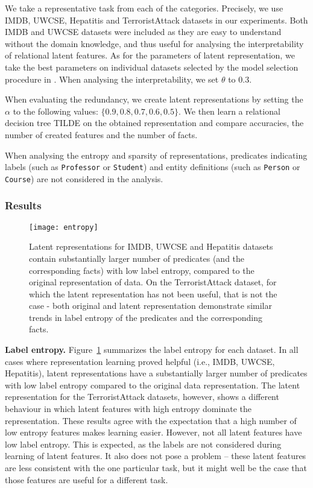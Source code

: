 We take a representative task from each of the categories.
Precisely, we use IMDB, UWCSE, Hepatitis and TerroristAttack datasets in our experiments.
Both IMDB and UWCSE datasets were included as they are easy to understand without the domain knowledge, and thus useful for analysing the interpretability of relational latent features.
As for the parameters of latent representation, we take the best parameters on individual datasets selected by the model selection procedure in \cite{Dumancic2017}.
When analysing the interpretability, we set $\theta$ to $0.3$.

When evaluating the redundancy, we create latent representations by setting the $\alpha$ to the following values: $\{0.9, 0.8, 0.7, 0.6, 0.5\}$.
We then learn a relational decision tree TILDE \cite{Blockeel1998285} on the obtained representation and compare accuracies, the number of created features and the number of facts.


When analysing the entropy and sparsity of representations, predicates indicating labels (such as \texttt{Professor} or \texttt{Student}) and entity definitions (such as \texttt{Person} or \texttt{Course}) are not considered in the analysis.


\subsubsection{Results}


\begin{figure}[t]
	\centering
	\medskip
    \texttt{[image: entropy]}
    \caption{Latent representations for IMDB, UWCSE and Hepatitis datasets contain substantially larger number of predicates (and the corresponding facts) with low label entropy, compared to the original representation of data. On the TerroristAttack dataset, for which the latent representation has not been useful, that is not the case - both original and latent representation demonstrate similar trends in label entropy of the predicates and the corresponding facts.}
    \label{fig:Entropy}
\end{figure}


\textbf{Label entropy.}
Figure~\ref{fig:Entropy} summarizes the label entropy for each dataset.
In all cases where representation learning proved helpful (i.e., IMDB, UWCSE, Hepatitis), latent representations have a substantially larger number of predicates with low label entropy compared to the original data representation.
The latent representation for the TerroristAttack datasets, however, shows a different behaviour in which latent features with high entropy dominate the representation.
These results agree with the expectation that a high number of low entropy features makes learning easier.
However, not all latent features have low label entropy.
This is expected, as the labels are not considered during learning of latent features.
It also does not pose a problem -- these latent features are less consistent with the one particular task, but it might well be the case that those features are useful for a different task.




